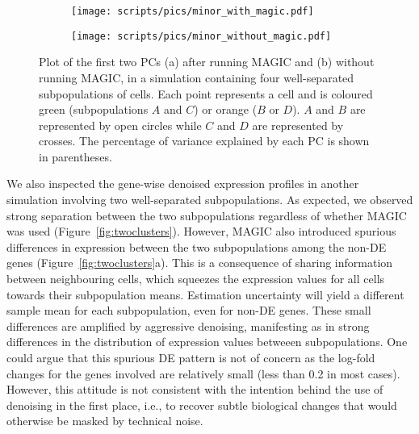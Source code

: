 \documentclass[10pt,letterpaper]{article}
\begin{document}
\begin{figure}[btp]
\centering
\begin{subfigure}[b]{0.49\textwidth}
    \texttt{[image: scripts/pics/minor\_with\_magic.pdf]}
    \caption{}
\end{subfigure}
\begin{subfigure}[b]{0.49\textwidth}
    \texttt{[image: scripts/pics/minor\_without\_magic.pdf]}
    \caption{}
\end{subfigure}
\caption{Plot of the first two PCs (a) after running MAGIC and (b) without running MAGIC, in a simulation containing four well-separated subpopulations of cells.
Each point represents a cell and is coloured green (subpopulations $A$ and $C$) or orange ($B$ or $D$).
$A$ and $B$ are represented by open circles while $C$ and $D$ are represented by crosses.
The percentage of variance explained by each PC is shown in parentheses.}
\label{fig:fourclusters}
\end{figure}

We also inspected the gene-wise denoised expression profiles in another simulation involving two well-separated subpopulations.
As expected, we observed strong separation between the two subpopulations regardless of whether MAGIC was used (Figure~\ref{fig:twoclusters}).
However, MAGIC also introduced spurious differences in expression between the two subpopulations among the non-DE genes (Figure~\ref{fig:twoclusters}a).
This is a consequence of sharing information between neighbouring cells, which squeezes the expression values for all cells towards their subpopulation means.
Estimation uncertainty will yield a different sample mean for each subpopulation, even for non-DE genes.
These small differences are amplified by aggressive denoising, manifesting as in strong differences in the distribution of expression values betweeen subpopulations.
One could argue that this spurious DE pattern is not of concern as the log-fold changes for the genes involved are relatively small (less than 0.2 in most cases).
However, this attitude is not consistent with the intention behind the use of denoising in the first place, 
i.e., to recover subtle biological changes that would otherwise be masked by technical noise.
\end{document}
